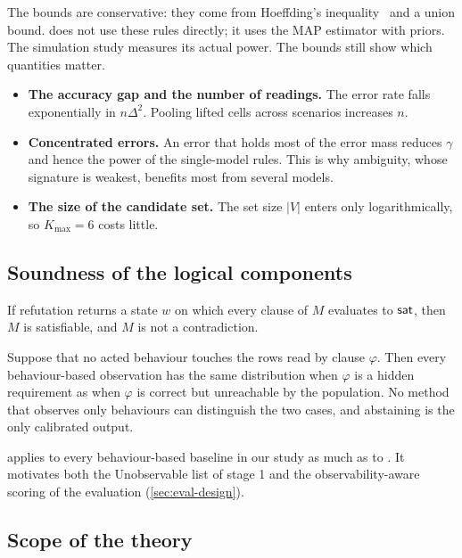 The bounds are conservative: they come from Hoeffding's inequality~\cite{hoeffding1963probability} and a union bound. \specdx does not use these rules directly; it uses the MAP estimator with priors. The simulation study measures its actual power. The bounds still show which quantities matter.
\begin{itemize}[leftmargin=*]
\item \textbf{The accuracy gap and the number of readings.} The error rate falls exponentially in $n\Delta^2$. Pooling lifted cells across scenarios increases $n$.
\item \textbf{Concentrated errors.} An error that holds most of the error mass reduces $\gamma$ and hence the power of the single-model rules. This is why ambiguity, whose signature is weakest, benefits most from several models.
\item \textbf{The size of the candidate set.} The set size $|V|$ enters only logarithmically, so $K_{\max}=6$ costs little.
\end{itemize}

\subsection{Soundness of the logical components}

\begin{proposition}
\label{prop:refute}
If refutation returns a state $w$ on which every clause of $M$ evaluates to $\textsf{sat}$, then $M$ is satisfiable, and $M$ is not a contradiction.
\end{proposition}

\begin{proposition}
\label{prop:noaction}
Suppose that no acted behaviour touches the rows read by clause $\varphi$. Then every behaviour-based observation has the same distribution when $\varphi$ is a hidden requirement as when $\varphi$ is correct but unreachable by the population. No method that observes only behaviours can distinguish the two cases, and abstaining is the only calibrated output.
\end{proposition}

 applies to every behaviour-based baseline in our study as much as to \specdx. It motivates both the Unobservable list of stage 1 and the observability-aware scoring of the evaluation (\cref{sec:eval-design}).

\subsection{Scope of the theory}
\label{sec:theory-scope}

